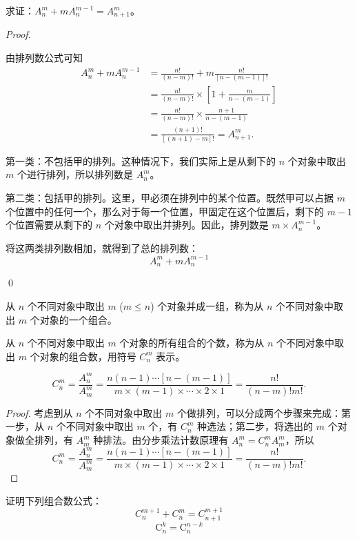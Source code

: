 \begin{example}
    求证：\( A_n^m + mA_n^{m-1} = A_{n+1}^m \)。

\end{example}
\begin{proof}
    \begin{way1}
        由排列数公式可知
\begin{align*}
A_n^m + mA_n^{m-1} &= \frac{n!}{(n-m)!} + m \frac{n!}{[n-(m-1)]!} \\
&= \frac{n!}{(n-m)!} \times \left[1 + \frac{m}{n-(m-1)}\right] \\
&= \frac{n!}{(n-m)!} \times \frac{n+1}{n-(m-1)} \\
&= \frac{(n+1)!}{[(n+1)-m]!} = A_{n+1}^m.
\end{align*}
    \end{way1}

    \begin{way2}
        第一类：不包括甲的排列。这种情况下，我们实际上是从剩下的 \( n \) 个对象中取出 \( m \) 个进行排列，所以排列数是 \( A_n^m \)。

第二类：包括甲的排列。这里，甲必须在排列中的某个位置。既然甲可以占据 \( m \) 个位置中的任何一个，那么对于每一个位置，甲固定在这个位置后，剩下的 \( m - 1 \) 个位置需要从剩下的 \( n \) 个对象中取出并排列。因此，排列数是 \( m \times A_n^{m-1} \)。

将这两类排列数相加，就得到了总的排列数：
\[ A_n^m + mA_n^{m-1} \]
    \end{way2}
\qed
\end{proof}

\begin{definition}
    从 \( n \) 个不同对象中取出 \( m \) (\( m \leq n \)) 个对象并成一组，称为从 \( n \) 个不同对象中取出 \( m \) 个对象的一个组合。

从 \( n \) 个不同对象中取出 \( m \) 个对象的所有组合的个数，称为从 \( n \) 个不同对象中取出 \( m \) 个对象的组合数，用符号 \( C_n^m \) 表示。
\end{definition}
\begin{theorem}
    \[
C_n^m = \frac{A_n^m}{A_m^m} = \frac{n(n-1)\cdots[n-(m-1)]}{m \times (m-1) \times \cdots \times 2 \times 1} = \frac{n!}{(n-m)!m!}.
\]
\end{theorem}
\begin{proof}
    考虑到从 \( n \) 个不同对象中取出 \( m \) 个做排列，可以分成两个步骤来完成：第一步，从 \( n \) 个不同对象中取出 \( m \) 个，有 \( C_n^m \) 种选法；第二步，将选出的 \( m \) 个对象做全排列，有 \( A_m^m \) 种排法。由分步乘法计数原理有 \( A_n^m = C_n^m A_m^m \)，所以
\[
C_n^m = \frac{A_n^m}{A_m^m} = \frac{n(n-1)\cdots[n-(m-1)]}{m \times (m-1) \times \cdots \times 2 \times 1} = \frac{n!}{(n-m)!m!}.
\]
\end{proof}
\begin{example}
    证明下列组合数公式：
    \[ C_n^{m+1} + C_n^m = C_{n+1}^{m+1}\]
    \[\mathrm{C}_n^k=\mathrm{C}_n^{n-k}\]

\end{example}

